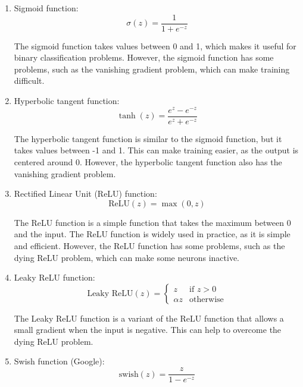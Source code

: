 \begin{enumerate}
    \item Sigmoid function:
    \begin{equation}
        \sigma(z) = \frac{1}{1 + e^{-z}}
    \end{equation}

    The sigmoid function takes values between 0 and 1, which makes it useful for
    binary classification problems. However, the sigmoid function has some problems,
    such as the vanishing gradient problem, which can make training difficult.

    \item Hyperbolic tangent function:
    \begin{equation}
        \tanh(z) = \frac{e^z - e^{-z}}{e^z + e^{-z}}
    \end{equation}

    The hyperbolic tangent function is similar to the sigmoid function, but it takes
    values between -1 and 1. This can make training easier, as the output is centered
    around 0. However, the hyperbolic tangent function also has the vanishing gradient
    problem.

    \item Rectified Linear Unit (ReLU) function:
    \begin{equation}
        \text{ReLU}(z) = \max(0, z)
    \end{equation}

    The ReLU function is a simple function that takes the maximum between 0 and the
    input. The ReLU function is widely used in practice, as it is simple and efficient.
    However, the ReLU function has some problems, such as the dying ReLU problem, which
    can make some neurons inactive.

    \item Leaky ReLU function:
    \begin{equation}
        \text{Leaky ReLU}(z) = \begin{cases}
            z & \text{if } z > 0\\
            \alpha z & \text{otherwise}
        \end{cases}
    \end{equation}

    The Leaky ReLU function is a variant of the ReLU function that allows a small
    gradient when the input is negative. This can help to overcome the dying ReLU
    problem.

    \item Swish function (Google):
    \begin{equation}
        \text{swish}(z) = \frac{z}{1 - e^{-z}}
    \end{equation}


\end{enumerate}
